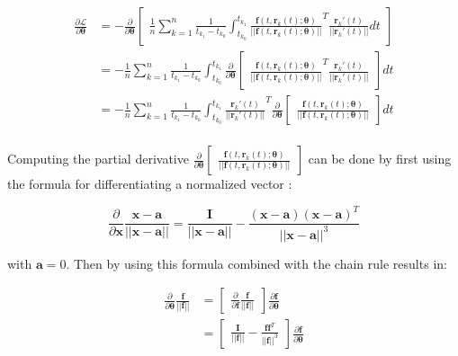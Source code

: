 \documentclass[12pt,a4paper]{book}
\begin{document}
\begin{equation}
    \begin{aligned}
        \frac{\partial \mathcal{L}}{\partial \bm{\theta}}
        & = - \frac{\partial}{\partial \bm{\theta}} \begin{bmatrix} \frac{1}{n} \sum_{k=1}^{n} \frac{1}{t_{k_1} - t_{k_0}} \int_{t_{k_0}}^{t_{k_1}} \frac{\bm{f}(t, \bm{r}_k(t); \bm{\theta})}{|| \bm{f}(t, \bm{r}_k(t); \bm{\theta}) ||} ^T \frac{\bm{r}_k'(t)}{|| \bm{r}_k'(t) ||} dt \end{bmatrix} \\
        & = - \frac{1}{n} \sum_{k=1}^{n} \frac{1}{t_{k_1} - t_{k_0}} \int_{t_{k_0}}^{t_{k_1}} \frac{\partial}{\partial \bm{\theta}} \begin{bmatrix} \frac{\bm{f}(t, \bm{r}_k(t); \bm{\theta})}{|| \bm{f}(t, \bm{r}_k(t); \bm{\theta}) ||} ^T \frac{\bm{r}_k'(t)}{|| \bm{r}_k'(t) ||} \end{bmatrix} dt \\
        & = - \frac{1}{n} \sum_{k=1}^{n} \frac{1}{t_{k_1} - t_{k_0}} \int_{t_{k_0}}^{t_{k_1}} \frac{\bm{r}_k'(t)}{|| \bm{r}_k'(t) ||}^T \frac{\partial}{\partial \bm{\theta}} \begin{bmatrix} \frac{\bm{f}(t, \bm{r}_k(t); \bm{\theta})}{|| \bm{f}(t, \bm{r}_k(t); \bm{\theta}) ||} \end{bmatrix} dt \\
    \end{aligned}
\end{equation}

Computing the partial derivative $\frac{\partial}{\partial \bm{\theta}} \begin{bmatrix} \frac{\bm{f}(t, \bm{r}_k(t); \bm{\theta})}{|| \bm{f}(t, \bm{r}_k(t); \bm{\theta}) ||} \end{bmatrix}$ can be done by first using the formula for differentiating a normalized vector \citep{matrixcookbook}:

\begin{equation}
    \frac{\partial}{\partial \bm{x}} \frac{\bm{x} - \bm{a}}{|| \bm{x} - \bm{a} ||}
    = \frac{\bm{I}}{|| \bm{x} - \bm{a} ||} - \frac{(\bm{x} - \bm{a}) (\bm{x} - \bm{a})^T}{|| \bm{x} - \bm{a} ||^3}
\end{equation}

\noindent with $\bm{a} = 0$. Then by using this formula combined with the chain rule results in:

\begin{equation}
    \begin{aligned}
        \frac{\partial}{\partial \bm{\theta}} \frac{\bm{f}}{|| \bm{f} ||}
        &= \begin{bmatrix} \frac{\partial}{\partial \bm{f}} \frac{\bm{f}}{|| \bm{f} ||} \end{bmatrix} \frac{\partial \bm{f}}{\partial \bm{\theta}} \\
        &= \begin{bmatrix} \frac{\bm{I}}{|| \bm{f} ||} - \frac{\bm{f} \bm{f}^T}{|| \bm{f} ||^3} \end{bmatrix} \frac{\partial \bm{f}}{\partial \bm{\theta}}
    \end{aligned}
\end{equation}
\end{document}
